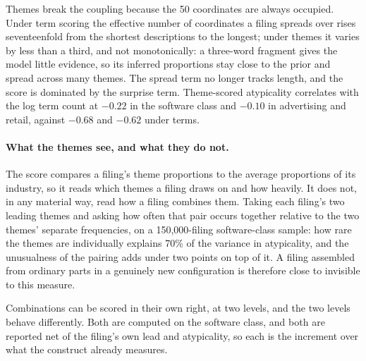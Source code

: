 Themes break the coupling because the 50 coordinates are always occupied.
Under term scoring the effective number of coordinates a filing spreads over
rises seventeenfold from the shortest descriptions to the longest; under
themes it varies by less than a third, and not monotonically: a three-word
fragment gives the model little evidence, so its inferred proportions stay
close to the prior and spread across many themes. The spread term no longer
tracks length, and the score is dominated by the surprise term.
Theme-scored atypicality correlates with the log term count at $-0.22$ in
the software class and $-0.10$ in advertising and retail, against $-0.68$
and $-0.62$ under terms.

\paragraph{What the themes see, and what they do not.} The score compares a
filing's theme proportions to the average proportions of its industry, so it
reads which themes a filing draws on and how heavily. It does not, in any
material way, read how a filing combines them. Taking each filing's two
leading themes and asking how often that pair occurs together relative to the
two themes' separate frequencies, on a 150{,}000-filing software-class
sample: how rare the themes are individually explains
70\% of the variance in atypicality, and the unusualness of the pairing adds
under two points on top of it. A filing assembled from ordinary parts in a
genuinely new configuration is therefore close to invisible to this measure.

Combinations can be scored in their own right, at two levels, and the two
levels behave differently. Both are computed on the software class, and both
are reported net of the filing's own lead and atypicality, so each is the
increment over what the construct already measures.

